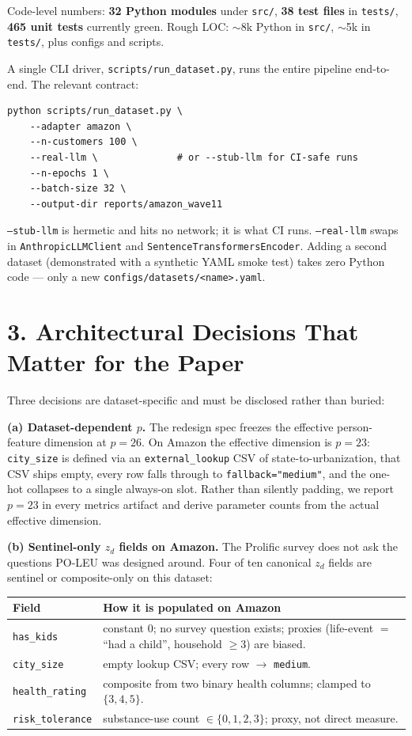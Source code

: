 \documentclass[11pt]{article}
\begin{document}
Code-level numbers: \textbf{32 Python modules} under \texttt{src/}, \textbf{38 test files} in \texttt{tests/}, \textbf{465 unit tests} currently green. Rough LOC: $\sim$8k Python in \texttt{src/}, $\sim$5k in \texttt{tests/}, plus configs and scripts.

A single CLI driver, \texttt{scripts/run\_dataset.py}, runs the entire pipeline end-to-end. The relevant contract:

\begin{Verbatim}[fontsize=\small,frame=single]
python scripts/run_dataset.py \
    --adapter amazon \
    --n-customers 100 \
    --real-llm \              # or --stub-llm for CI-safe runs
    --n-epochs 1 \
    --batch-size 32 \
    --output-dir reports/amazon_wave11
\end{Verbatim}

\texttt{--stub-llm} is hermetic and hits no network; it is what CI runs. \texttt{--real-llm} swaps in \texttt{AnthropicLLMClient} and \texttt{SentenceTransformersEncoder}. Adding a second dataset (demonstrated with a synthetic YAML smoke test) takes zero Python code --- only a new \texttt{configs/datasets/<name>.yaml}.

\section*{3. Architectural Decisions That Matter for the Paper}

Three decisions are dataset-specific and must be disclosed rather than buried:

\textbf{(a) Dataset-dependent $p$.} The redesign spec freezes the effective person-feature dimension at $p=26$. On Amazon the effective dimension is $p=23$: \texttt{city\_size} is defined via an \texttt{external\_lookup} CSV of state-to-urbanization, that CSV ships empty, every row falls through to \texttt{fallback="medium"}, and the one-hot collapses to a single always-on slot. Rather than silently padding, we report $p=23$ in every metrics artifact and derive parameter counts from the actual effective dimension.

\textbf{(b) Sentinel-only $z_d$ fields on Amazon.} The Prolific survey does not ask the questions PO-LEU was designed around. Four of ten canonical $z_d$ fields are sentinel or composite-only on this dataset:

\begin{longtable}{l p{}}
\toprule
Field & How it is populated on Amazon \\
\midrule
\texttt{has\_kids} & constant 0; no survey question exists; proxies (life-event $=$ ``had a child'', household $\geq 3$) are biased. \\
\texttt{city\_size} & empty lookup CSV; every row $\to$ \texttt{medium}. \\
\texttt{health\_rating} & composite from two binary health columns; clamped to $\{3,4,5\}$. \\
\texttt{risk\_tolerance} & substance-use count $\in \{0,1,2,3\}$; proxy, not direct measure. \\
\bottomrule
\end{longtable}
\end{document}
